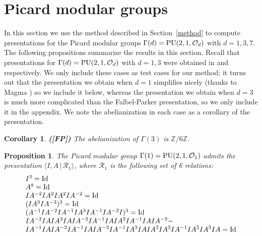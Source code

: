 \documentclass{article}[12pt]
\newcommand{\Z}{\mathbb{Z}}
\newcommand{\la}{\langle}
\newcommand{\ra}{\rangle}
\newtheorem{cor}{Corollary}
\newtheorem{prop}{Proposition}%
\begin{document}
\section{Picard modular groups}

In this section we use the method described in Section~\ref{method} to compute presentations for the Picard modular groups $\Gamma(d)={\rm PU}(2,1,\mathcal{O}_d)$ with $d=1,3,7$. The following propositions summarize the results in this section. Recall that presentations for $\Gamma(d)={\rm PU}(2,1,\mathcal{O}_d)$ with $d=1,3$ were obtained in \cite{FP} and \cite{FFP} respectively. We only include these cases as test cases for our method; it turns out that the presentation we obtain when $d=1$ simplifies nicely (thanks to Magma \cite{Mag}) so we include it below, whereas the presentation we obtain when $d=3$ is much more complicated than the Falbel-Parker presentation, so we only include it in the appendix. We note the abelianization in each case as a corollary of the presentation.  

\begin{cor}{\bf ([FP])} The abelianization of $\Gamma(3)$ is $\Z/6\Z$.
\end{cor}

\begin{prop}\label{presentationd=1} The Picard modular group $\Gamma(1)={\rm PU}(2,1,\mathcal{O}_1)$ admits the presentation $\la I, A  \, | \, \mathcal{R}_1 \ra$, where $\mathcal{R}_1$ is the following set of 6 relations:
$$\begin{array}{l}
I^2 = {\rm Id} \\
    A^8 = {\rm Id} \\
    I  A^{-2}  I  A^2  I  A^2  I  A^{-2} = {\rm Id} \\
    (I  A^3  I  A^{-3})^3 = {\rm Id} \\
    (A^{-1}  I  A^{-2}  I  A^{-1}  I  A^3  I  A^{-1}  I 
    A^{-2}  I)^3 = {\rm Id} \\
    I  A^{-2}  I  A  I  A^3  I  A  I  A^{-2}  I 
    A^{-1}  I  A  I  A^2  I  A^{-1}  I  A  I  A^{-2}  -\\
    I  A^{-1}  I  A  I  A^{-2}  I  A^{-1}  I  A  I 
    A^{-2}  I  A^{-1}  I  A^3  I  A  I  A^3  I  A^3
     I  A^{-1}  I  A^3  I  A^3  I  A = {\rm Id} 
\end{array}$$
\end{prop}
\end{document}
